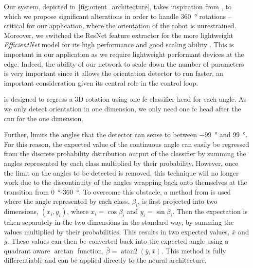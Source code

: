 \documentclass[conference]{ieeeconf}
\DeclareMathOperator{\atantwo}{atan2}
\begin{document}
Our system, depicted in~\cref{fig:orient_architecture}, takes inspiration from \cite{ruiz2018fine}, to which we propose significant alterations in order to handle \SI{360}{\degree} rotations -- critical for our application, where the orientation of the robot is unrestrained.
Moreover, we switched the ResNet feature extractor for the more lightweight \textit{EfficientNet} model for its high performance and good scaling ability \cite{tan2019efficientnet}.
This is important in our application as we require lightweight performant devices at the edge.
Indeed, the ability of our network to scale down the number of parameters is very important since it allows the orientation detector to run faster, an important consideration given its central role in the control loop.

\cite{ruiz2018fine} is designed to regress a 3D rotation using one \gls{fc} classifier head for each angle.
As we only detect orientation in one dimension, we only need one \gls{fc} head after the \gls{cnn} for the one dimension.

Further, \cite{ruiz2018fine} limits the angles that the detector can sense to between \SI{-99}{\degree} and \SI{99}{\degree}.
For this reason, the expected value of the continuous angle can easily be regressed from the discrete probability distribution output of the classifier by summing the angles represented by each class multiplied by their probability.
However, once the limit on the angles to be detected is removed, this technique will no longer work due to the discontinuity of the angles wrapping back onto themselves at the transition from \SI{0}{\degree}-\SI{360}{\degree}.
To overcome this obstacle, a method from \cite{jammalamadaka2001topics} is used where the angle represented by each class, $\beta_i$, is first projected into two dimensions, $(x_i, y_i)$, where $x_i = \cos{\beta_i}$ and $y_i = \sin{\beta_i}$.
Then the expectation is taken separately in the two dimensions in the standard way, by summing the values multiplied by their probabilities.
This results in two expected values, $\bar{x}$ and $\bar{y}$.
These values can then be converted back into the expected angle using a quadrant aware $\arctan$ function, $\bar{\beta} = \atantwo(\bar{y}, \bar{x})$.
This method is fully differentiable and can be applied directly to the neural architecture.
\end{document}
